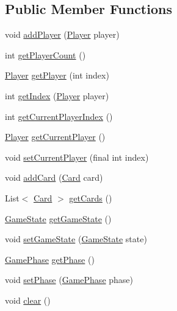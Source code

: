 \subsection*{\-Public \-Member \-Functions}
\begin{DoxyCompactItemize}
\item 
void \hyperlink{interfacedominion_1_1model_1_1Game_a0f0a112c9e65158ed35b31eee39a90ab}{add\-Player} (\hyperlink{interfacedominion_1_1model_1_1Player}{\-Player} player)
\item 
int \hyperlink{interfacedominion_1_1model_1_1Game_a15f55987f9af6c4edb717ffce99e4df1}{get\-Player\-Count} ()
\item 
\hyperlink{interfacedominion_1_1model_1_1Player}{\-Player} \hyperlink{interfacedominion_1_1model_1_1Game_aa6f8e5780c5655418302555f3a398396}{get\-Player} (int index)
\item 
int \hyperlink{interfacedominion_1_1model_1_1Game_a456d7c45ddf88bdea357b7a6fbc8ae4a}{get\-Index} (\hyperlink{interfacedominion_1_1model_1_1Player}{\-Player} player)
\item 
int \hyperlink{interfacedominion_1_1model_1_1Game_a4128e6069773d06e9380364ba914699f}{get\-Current\-Player\-Index} ()
\item 
\hyperlink{interfacedominion_1_1model_1_1Player}{\-Player} \hyperlink{interfacedominion_1_1model_1_1Game_a1d0d3b3f71201f4c39828eaf84ab108b}{get\-Current\-Player} ()
\item 
void \hyperlink{interfacedominion_1_1model_1_1Game_aa61f5a52bd12f6b9d3a563b157bdfe5a}{set\-Current\-Player} (final int index)
\item 
void \hyperlink{interfacedominion_1_1model_1_1Game_a1d2ee8cbe1f2efdd3827d5122466214c}{add\-Card} (\hyperlink{interfacedominion_1_1model_1_1cards_1_1Card}{\-Card} card)
\item 
\-List$<$ \hyperlink{interfacedominion_1_1model_1_1cards_1_1Card}{\-Card} $>$ \hyperlink{interfacedominion_1_1model_1_1Game_aa3bad1b2af84bc74977623b08dc60003}{get\-Cards} ()
\item 
\hyperlink{enumdominion_1_1common_1_1GameState}{\-Game\-State} \hyperlink{interfacedominion_1_1model_1_1Game_a9f57304d4d35a13e715dbe5e8b44194f}{get\-Game\-State} ()
\item 
void \hyperlink{interfacedominion_1_1model_1_1Game_ae8a41a10cc6f55e614846cc2b715f260}{set\-Game\-State} (\hyperlink{enumdominion_1_1common_1_1GameState}{\-Game\-State} state)
\item 
\hyperlink{enumdominion_1_1common_1_1GamePhase}{\-Game\-Phase} \hyperlink{interfacedominion_1_1model_1_1Game_a49504a84f1c62bed78cc9e8c0f1723a1}{get\-Phase} ()
\item 
void \hyperlink{interfacedominion_1_1model_1_1Game_a3c23e993203429d715ba2a1de6f58d07}{set\-Phase} (\hyperlink{enumdominion_1_1common_1_1GamePhase}{\-Game\-Phase} phase)
\item 
void \hyperlink{interfacedominion_1_1model_1_1Game_a1e88c414715e878b07c91c2e16f76335}{clear} ()
\end{DoxyCompactItemize}


